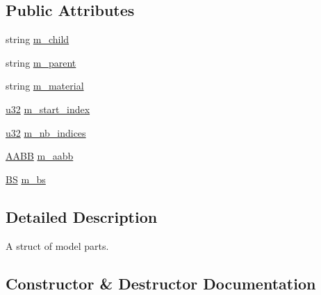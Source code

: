 \subsection*{Public Attributes}
\begin{DoxyCompactItemize}
\item 
string \hyperlink{structmage_1_1_model_part_abac2e9942c2d8015dc8b4f363729dc45}{m\+\_\+child}
\item 
string \hyperlink{structmage_1_1_model_part_ad4754bbb69d28885c09cef591d4d96c5}{m\+\_\+parent}
\item 
string \hyperlink{structmage_1_1_model_part_a606603dd01b895cb1aa91b51089bf27f}{m\+\_\+material}
\item 
\hyperlink{namespacemage_af2b398bf98eb10351f49cad73fe2cc73}{u32} \hyperlink{structmage_1_1_model_part_a94f1ee05790ef927c497807bca13202b}{m\+\_\+start\+\_\+index}
\item 
\hyperlink{namespacemage_af2b398bf98eb10351f49cad73fe2cc73}{u32} \hyperlink{structmage_1_1_model_part_acb83657cacc4ed328dac0049a38cdd75}{m\+\_\+nb\+\_\+indices}
\item 
\hyperlink{structmage_1_1_a_a_b_b}{A\+A\+BB} \hyperlink{structmage_1_1_model_part_ab5b4cb74ac7d725896825b0f7ce8472a}{m\+\_\+aabb}
\item 
\hyperlink{structmage_1_1_b_s}{BS} \hyperlink{structmage_1_1_model_part_a551f6c340fa5547364e6cde9720ad856}{m\+\_\+bs}
\end{DoxyCompactItemize}


\subsection{Detailed Description}
A struct of model parts. 

\subsection{Constructor \& Destructor Documentation}
\hypertarget{structmage_1_1_model_part_ab372a2c3f852ccc795a4d55bc81abf8d}{}\label{structmage_1_1_model_part_ab372a2c3f852ccc795a4d55bc81abf8d} 
